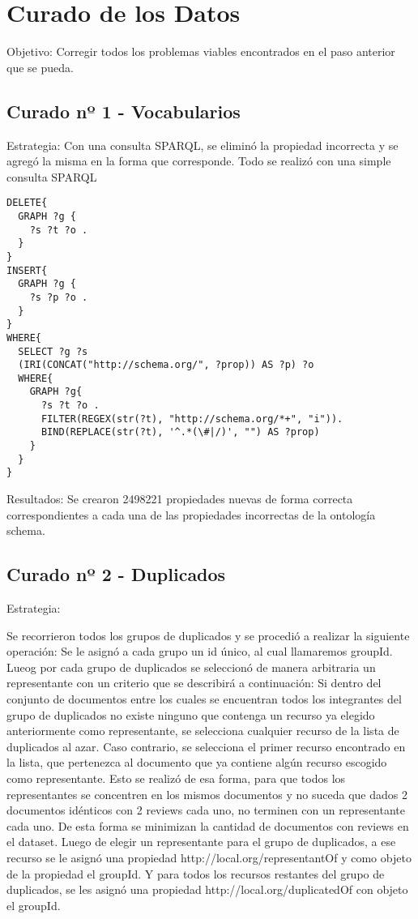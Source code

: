 \chapter{Curado de los Datos}
\label{chapter:curado}

Objetivo:
Corregir todos los problemas viables encontrados en el paso anterior que se pueda.

\section{Curado nº 1 - Vocabularios}
\label{section:curado-vocabularios}

Estrategia:
Con una consulta SPARQL, se eliminó la propiedad incorrecta y se agregó la misma en la forma que corresponde.
Todo se realizó con una simple consulta SPARQL
\begin{lstlisting}[frame=single]  
DELETE{
  GRAPH ?g {
    ?s ?t ?o .
  }
}
INSERT{
  GRAPH ?g {
    ?s ?p ?o .
  }
}
WHERE{
  SELECT ?g ?s 
  (IRI(CONCAT("http://schema.org/", ?prop)) AS ?p) ?o
  WHERE{
    GRAPH ?g{
      ?s ?t ?o .
      FILTER(REGEX(str(?t), "http://schema.org/*+", "i")).
      BIND(REPLACE(str(?t), '^.*(\#|/)', "") AS ?prop)
    }
  }
}
\end{lstlisting}


Resultados:
Se crearon 2498221 propiedades nuevas de forma correcta correspondientes a cada una de las propiedades incorrectas de la ontología 
schema.

\section{Curado nº 2 - Duplicados}
\label{section:curado-duplicados}

Estrategia: 

Se recorrieron todos los grupos de duplicados y se procedió a realizar la siguiente operación:
Se le asignó a cada grupo un id único, al cual llamaremos groupId.
Lueog por cada grupo de duplicados se seleccionó de manera arbitraria un representante con un criterio que se describirá a continuación:
Si dentro del conjunto de documentos entre los cuales se encuentran todos los integrantes del grupo de duplicados no existe ninguno 
que contenga un recurso ya elegido anteriormente como representante, se selecciona cualquier recurso de la lista de duplicados al azar.
Caso contrario, se selecciona el primer recurso encontrado en la lista, que pertenezca al documento que ya contiene algún recurso escogido 
como representante.
Esto se realizó de esa forma, para que todos los representantes se concentren en los mismos documentos y no suceda que dados 2 
documentos idénticos con 2 reviews cada uno, no terminen con un representante cada uno. De esta forma se minimizan la cantidad de 
documentos con reviews en el dataset.
Luego de elegir un representante para el grupo de duplicados, a ese recurso se le asignó una propiedad http://local.org/representantOf y 
como objeto de la propiedad el groupId.
Y para todos los recursos restantes del grupo de duplicados, se les asignó una propiedad http://local.org/duplicatedOf con objeto 
el groupId.

